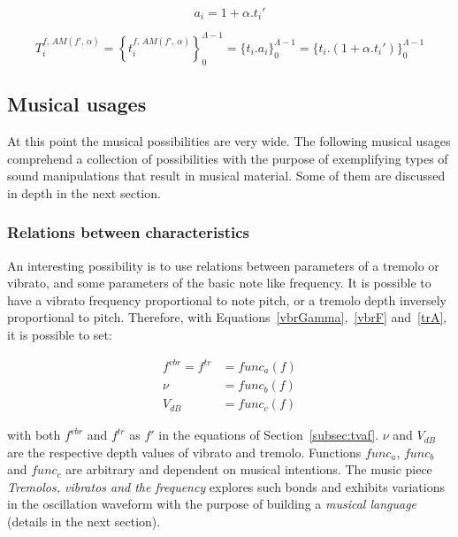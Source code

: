 \begin{equation}\label{amA}
a_i=1 + \alpha . t_i'
\end{equation}

\begin{equation}\label{amT}
T_i^{f,\,AM(f',\,\alpha)}=\left\{ t_i^{f,\,AM(f',\,\alpha)} \right\}_0^{\Lambda-1}=\{ t_i . a_i \}_0^{\Lambda-1}= \{t_i . (1 + \alpha . t_i')    \}_0^{\Lambda-1}
\end{equation}

\subsection{Musical usages}\label{subsec:mus2}
At this point the musical possibilities are very wide.
The following musical usages comprehend a collection of possibilities with the purpose of exemplifying types of sound manipulations that result in musical material. Some of them are discussed in depth in the next section.

\subsubsection{Relations between characteristics}
An interesting possibility is to use relations between parameters of
a tremolo or vibrato, and some parameters of the basic note like frequency. It is possible to have a vibrato frequency proportional
to note pitch, or a tremolo depth inversely proportional to
pitch. Therefore, with Equations~\ref{vbrGamma},~\ref{vbrF} and~\ref{trA}, it is possible to set:

\begin{equation}\label{eq:vinculos}
\begin{split}
f^{vbr} = f^{tr} & = func_a(f) \\
\nu & = func_b(f) \\
V_{dB} & = func_c(f)
\end{split}
\end{equation}

\noindent with both $f^{vbr}$ and $f^{tr}$ as $f'$ in the equations of Section~\ref{subsec:tvaf}.
 $\nu$ and $V_{dB}$ are the respective depth values of vibrato and
tremolo. Functions $func_a$, $func_b$ and $func_c$ are arbitrary and dependent on musical intentions. The music piece \emph{Tremolos, vibratos and the
frequency} explores such bonds and exhibits variations in the oscillation waveform with the purpose of building a \emph{musical
language} (details in the next section).~\cite{MASSA}

